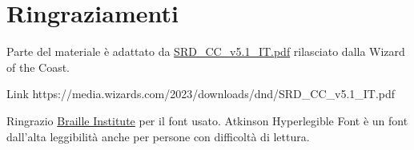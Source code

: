 \section{Ringraziamenti}


Parte del materiale è adattato da  \href{https://media.wizards.com/2023/downloads/dnd/SRD_CC_v5.1_IT.pdf}{SRD\_CC\_v5.1\_IT.pdf} rilasciato dalla Wizard of the Coast.

Link https://media.wizards.com/2023/downloads/dnd/SRD\_CC\_v5.1\_IT.pdf

\medskip


Ringrazio \href{https://www.brailleinstitute.org/freefont/}{Braille Institute} per il font usato. Atkinson Hyperlegible Font è un font dall'alta leggibilità anche per persone con difficoltà di lettura.

